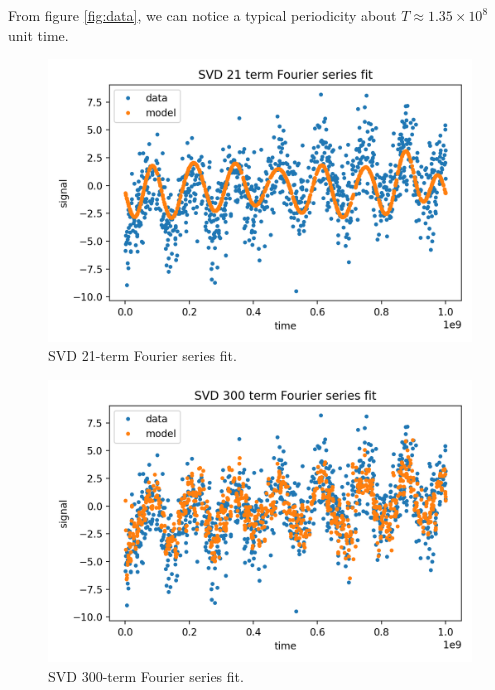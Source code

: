 \documentclass[11pt]{article}
\begin{document}
From figure \ref{fig:data}, we can notice a typical periodicity about $T \approx 1.35 \times 10^8$ unit time.
\begin{figure}[H]
    \centering
    \includegraphics[scale = 0.7]{images/ps-5-3e.png}
    \caption{SVD 21-term Fourier series fit.}
    \label{fig:21term}
\end{figure}
\begin{figure}[H]
    \centering
    \includegraphics[scale = 0.7]{images/ps-5-3e2.png}
    \caption{SVD 300-term Fourier series fit.}
    \label{fig:300term}
\end{figure}
\end{document}
